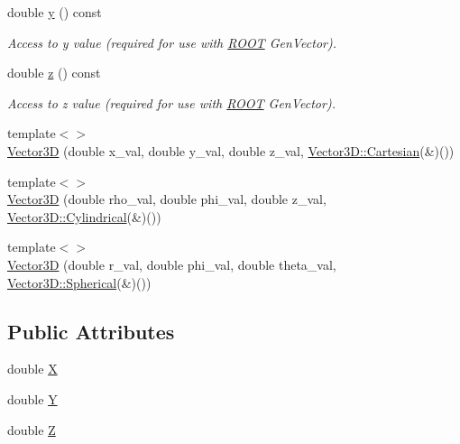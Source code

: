 \begin{DoxyCompactItemize}
double \hyperlink{struct_d_d4hep_1_1_d_d_segmentation_1_1_vector3_d_a315b5dbb6abf747eac4a0432826b482f}{y} () const 
\begin{DoxyCompactList}\small\item\em Access to y value (required for use with \hyperlink{namespace_r_o_o_t}{ROOT} GenVector). \item\end{DoxyCompactList}\item 
double \hyperlink{struct_d_d4hep_1_1_d_d_segmentation_1_1_vector3_d_ab30126e2b17eeb8638b4c5ebbb1b5278}{z} () const 
\begin{DoxyCompactList}\small\item\em Access to z value (required for use with \hyperlink{namespace_r_o_o_t}{ROOT} GenVector). \item\end{DoxyCompactList}\item 
{\footnotesize template$<$$>$ }\\\hyperlink{struct_d_d4hep_1_1_d_d_segmentation_1_1_vector3_d_adc2c2cbe8343822700e3063de9782140}{Vector3D} (double x\_\-val, double y\_\-val, double z\_\-val, \hyperlink{struct_d_d_surfaces_1_1_vector3_d_1_1_cartesian}{Vector3D::Cartesian}(\&)())
\item 
{\footnotesize template$<$$>$ }\\\hyperlink{struct_d_d4hep_1_1_d_d_segmentation_1_1_vector3_d_aa8a30ee863297b55f42329988d2481e8}{Vector3D} (double rho\_\-val, double phi\_\-val, double z\_\-val, \hyperlink{struct_d_d_surfaces_1_1_vector3_d_1_1_cylindrical}{Vector3D::Cylindrical}(\&)())
\item 
{\footnotesize template$<$$>$ }\\\hyperlink{struct_d_d4hep_1_1_d_d_segmentation_1_1_vector3_d_ad09f6943130718a31edf854582980314}{Vector3D} (double r\_\-val, double phi\_\-val, double theta\_\-val, \hyperlink{struct_d_d_surfaces_1_1_vector3_d_1_1_spherical}{Vector3D::Spherical}(\&)())
\end{DoxyCompactItemize}
\subsection*{Public Attributes}
\begin{DoxyCompactItemize}
\item 
double \hyperlink{struct_d_d4hep_1_1_d_d_segmentation_1_1_vector3_d_ac48f4f10c3545a48be92b2f970177868}{X}
\item 
double \hyperlink{struct_d_d4hep_1_1_d_d_segmentation_1_1_vector3_d_a9cde1750ebf8b923704e6118f00d1ed6}{Y}
\item 
double \hyperlink{struct_d_d4hep_1_1_d_d_segmentation_1_1_vector3_d_a80100f70c9d120e5a5f6abd1fcbac26f}{Z}
\end{DoxyCompactItemize}


